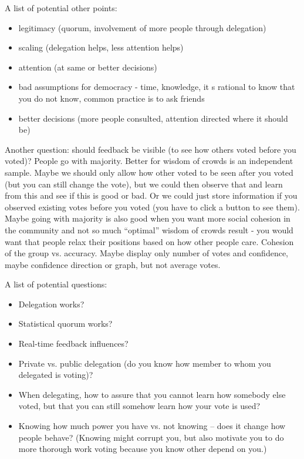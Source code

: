 \documentclass{sigchi}
\begin{document}
A list of potential other points:
\begin{itemize}
\item legitimacy (quorum, involvement of more people through delegation)
\item scaling (delegation helps, less attention helps)
\item attention (at same or better decisions)
\item bad assumptions for democracy - time, knowledge, it s rational to know that you do not know, common practice is to ask friends
\item better decisions (more people consulted, attention directed where it should be)
\end{itemize}

Another question: should feedback be visible (to see how others voted before you voted)?
People go with majority.
Better for wisdom of crowds is an independent sample.
Maybe we should only allow how other voted to be seen after you voted (but you can still change the vote),
but we could then observe that and learn from this and see if this is good or bad.
Or we could just store information if you observed existing votes before you voted (you have to click a button to see them).
Maybe going with majority is also good when you want more social cohesion in the community and not so much ``optimal''
wisdom of crowds result -  you would want that people relax their positions based on how other people care.
Cohesion of the group vs. accuracy.
Maybe display only number of votes and confidence, maybe confidence direction or graph, but not average votes.

A list of potential questions:
\begin{itemize}
\item Delegation works?
\item Statistical quorum works?
\item Real-time feedback influences?
\item Private vs. public delegation (do you know how member to whom you delegated is voting)?
\item When delegating, how to assure that you cannot learn how somebody else voted, but that you can still somehow
learn how your vote is used?
\item Knowing how much power you have vs. not knowing -- does it change how people behave? (Knowing might corrupt you, but also motivate you to do more thorough work voting because you know other depend on you.)
\end{itemize}
\end{document}
